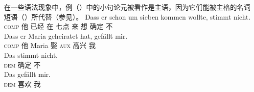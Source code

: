 \noindent
在一些语法现象中，例（）中的小句论元被看作是主语，因为它们能被主格的名词短语（）所代替（参见\citet[, 289]{Eisenberg2004a}）。
\eal
\ex
\gll Dass er schon um sieben kommen wollte, stimmt nicht.\\
	 \textsc{comp} 他 已经 在 七点 来 想 确定 不\\
\ex 
\gll Dass er Maria geheiratet hat, gefällt mir.\\
	 \textsc{comp} 他 Maria 娶 \textsc{aux} 高兴 我\\
\zl
\eal
\ex
\gll Das stimmt nicht.\\
	 \textsc{dem} 确定 不\\
\ex 
\gll Das gefällt mir.\\
	  \textsc{dem} 喜欢 我\\
\zl
